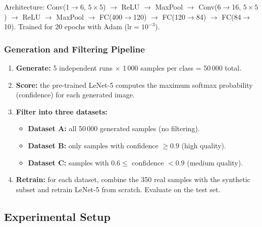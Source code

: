\documentclass[12pt, a4paper]{article}
\begin{document}
Architecture: Conv(1$\to$6, $5\!\times\!5$) $\to$ ReLU $\to$ MaxPool $\to$
Conv(6$\to$16, $5\!\times\!5$) $\to$ ReLU $\to$ MaxPool $\to$ FC(400$\to$120) $\to$
FC(120$\to$84) $\to$ FC(84$\to$10).  Trained for 20 epochs with Adam ($\text{lr} = 10^{-3}$).

\subsubsection{Generation and Filtering Pipeline}

\begin{enumerate}
    \item \textbf{Generate:} 5 independent runs $\times$ 1\,000 samples per class = 50\,000 total.
    \item \textbf{Score:} the pre-trained LeNet-5 computes the maximum softmax probability
          (confidence) for each generated image.
    \item \textbf{Filter into three datasets:}
    \begin{itemize}
        \item \textbf{Dataset A:} all 50\,000 generated samples (no filtering).
        \item \textbf{Dataset B:} only samples with confidence $\geq 0.9$ (high quality).
        \item \textbf{Dataset C:} samples with $0.6 \leq$ confidence $< 0.9$ (medium quality).
    \end{itemize}
    \item \textbf{Retrain:} for each dataset, combine the 350 real samples with the synthetic
          subset and retrain LeNet-5 from scratch.  Evaluate on the test set.
\end{enumerate}

\subsection{Experimental Setup}
\end{document}
